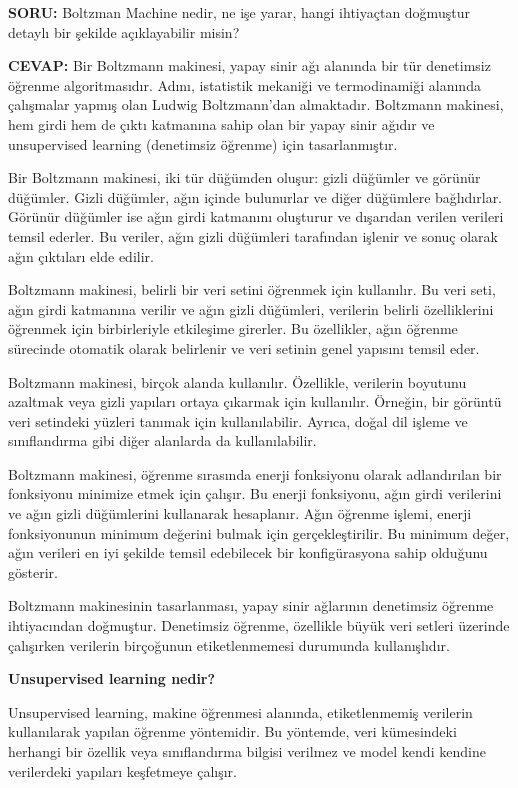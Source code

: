 \documentclass[11pt]{article}
\begin{document}
\textbf{SORU:} Boltzman Machine nedir, ne işe yarar, hangi ihtiyaçtan doğmuştur detaylı bir şekilde açıklayabilir misin?

\textbf{CEVAP:} Bir Boltzmann makinesi, yapay sinir ağı alanında bir tür denetimsiz öğrenme algoritmasıdır. Adını, istatistik mekaniği ve termodinamiği alanında çalışmalar yapmış olan Ludwig Boltzmann'dan almaktadır. Boltzmann makinesi, hem girdi hem de çıktı katmanına sahip olan bir yapay sinir ağıdır ve unsupervised learning (denetimsiz öğrenme) için tasarlanmıştır.

Bir Boltzmann makinesi, iki tür düğümden oluşur: gizli düğümler ve görünür düğümler. Gizli düğümler, ağın içinde bulunurlar ve diğer düğümlere bağlıdırlar. Görünür düğümler ise ağın girdi katmanını oluşturur ve dışarıdan verilen verileri temsil ederler. Bu veriler, ağın gizli düğümleri tarafından işlenir ve sonuç olarak ağın çıktıları elde edilir.

Boltzmann makinesi, belirli bir veri setini öğrenmek için kullanılır. Bu veri seti, ağın girdi katmanına verilir ve ağın gizli düğümleri, verilerin belirli özelliklerini öğrenmek için birbirleriyle etkileşime girerler. Bu özellikler, ağın öğrenme sürecinde otomatik olarak belirlenir ve veri setinin genel yapısını temsil eder.

Boltzmann makinesi, birçok alanda kullanılır. Özellikle, verilerin boyutunu azaltmak veya gizli yapıları ortaya çıkarmak için kullanılır. Örneğin, bir görüntü veri setindeki yüzleri tanımak için kullanılabilir. Ayrıca, doğal dil işleme ve sınıflandırma gibi diğer alanlarda da kullanılabilir.

Boltzmann makinesi, öğrenme sırasında enerji fonksiyonu olarak adlandırılan bir fonksiyonu minimize etmek için çalışır. Bu enerji fonksiyonu, ağın girdi verilerini ve ağın gizli düğümlerini kullanarak hesaplanır. Ağın öğrenme işlemi, enerji fonksiyonunun minimum değerini bulmak için gerçekleştirilir. Bu minimum değer, ağın verileri en iyi şekilde temsil edebilecek bir konfigürasyona sahip olduğunu gösterir.

Boltzmann makinesinin tasarlanması, yapay sinir ağlarının denetimsiz öğrenme ihtiyacından doğmuştur. Denetimsiz öğrenme, özellikle büyük veri setleri üzerinde çalışırken verilerin birçoğunun etiketlenmemesi durumunda kullanışlıdır.

\textbf{Unsupervised learning nedir?}

Unsupervised learning, makine öğrenmesi alanında, etiketlenmemiş verilerin kullanılarak yapılan öğrenme yöntemidir. Bu yöntemde, veri kümesindeki herhangi bir özellik veya sınıflandırma bilgisi verilmez ve model kendi kendine verilerdeki yapıları keşfetmeye çalışır.
\end{document}
